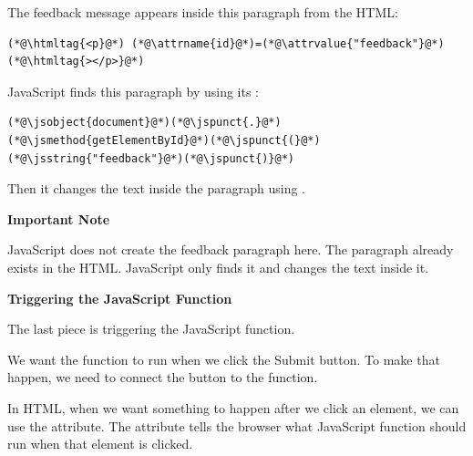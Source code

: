 \documentclass{article}
\begin{document}
\vspace{0.1cm}

The feedback message appears inside this paragraph from the HTML:

\vspace{0.1cm}

\begin{lstlisting}
(*@\htmltag{<p}@*) (*@\attrname{id}@*)=(*@\attrvalue{"feedback"}@*)(*@\htmltag{></p>}@*)
\end{lstlisting}

\vspace{0.2cm}

JavaScript finds this paragraph by using its :

\vspace{0.1cm}

\begin{lstlisting}
(*@\jsobject{document}@*)(*@\jspunct{.}@*)(*@\jsmethod{getElementById}@*)(*@\jspunct{(}@*)(*@\jsstring{"feedback"}@*)(*@\jspunct{)}@*)
\end{lstlisting}

\vspace{0.2cm}

Then it changes the text inside the paragraph using .

\vspace{0.3cm}

\begin{attentionbox}
  \textbf{\Bitter\textcolor{naranja}{Important Note}}

  JavaScript does not create the feedback paragraph here.
  The paragraph already exists in the HTML.
  JavaScript only finds it and changes the text inside it.
\end{attentionbox}

\vspace{0.4cm}

\textbf{\Bitter\textcolor{naranja}{Triggering the JavaScript Function}}

\vspace{0.1cm}

The last piece is triggering the JavaScript function.

We want the  function to run when we click the Submit button.
To make that happen, we need to connect the button to the function.

In HTML, when we want something to happen after we click an element, we can use the  attribute.
The  attribute tells the browser what JavaScript function should run when that element is clicked.
\end{document}
